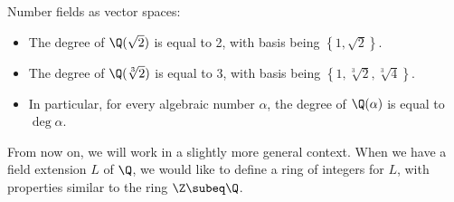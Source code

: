 \begin{ex} Number fields as vector spaces:
\begin{itemize}
\item The degree of $\Q(\sqrt{2})$ is equal to 2, with basis being $\left\{1, \sqrt{2}\right\}$.
\item The degree of $\Q(\sqrt[3]{2})$ is equal to 3, with basis being $\left\{1, \sqrt[3]{2}, \sqrt[3]{4}\right\}$.
\item In particular, for every algebraic number $\alpha$, the degree of $\Q(\alpha)$ is equal to $\deg \alpha$.
\end{itemize}
\end{ex}

\noindent From now on, we will work in a slightly more general context. When we have a field extension $L$ of $\Q$, we would like to define a ring of integers for $L$, with properties similar to the ring $\Z\subeq \Q$.

